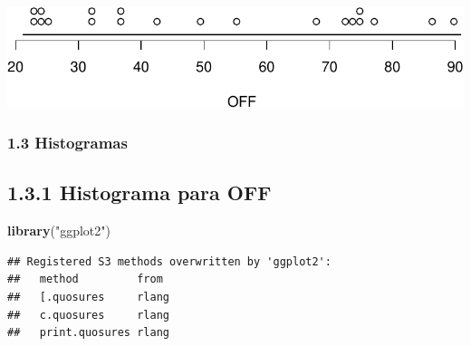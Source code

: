 \documentclass[]{article}
\newenvironment{Shaded}{\begin{snugshade}}{\end{snugshade}}
\newcommand{\DataTypeTok}[1]{\textcolor[rgb]{0.13,0.29,0.53}{#1}}
\newcommand{\KeywordTok}[1]{\textcolor[rgb]{0.13,0.29,0.53}{\textbf{#1}}}
\newcommand{\NormalTok}[1]{#1}
\newcommand{\OperatorTok}[1]{\textcolor[rgb]{0.81,0.36,0.00}{\textbf{#1}}}
\newcommand{\StringTok}[1]{\textcolor[rgb]{0.31,0.60,0.02}{#1}}
\begin{document}
\begin{Shaded}
\end{Shaded}

\includegraphics{pep1_files/figure-latex/unnamed-chunk-7-1.pdf}

\hypertarget{histogramas}{%
\subsubsection{1.3 Histogramas}\label{histogramas}}

\hypertarget{histograma-para-off}{%
\subsection{1.3.1 Histograma para OFF}\label{histograma-para-off}}

\begin{Shaded}
\begin{Highlighting}[]
\KeywordTok{library}\NormalTok{(}\StringTok{"ggplot2"}\NormalTok{)}
\end{Highlighting}
\end{Shaded}

\begin{verbatim}
## Registered S3 methods overwritten by 'ggplot2':
##   method         from 
##   [.quosures     rlang
##   c.quosures     rlang
##   print.quosures rlang
\end{verbatim}
\end{document}
